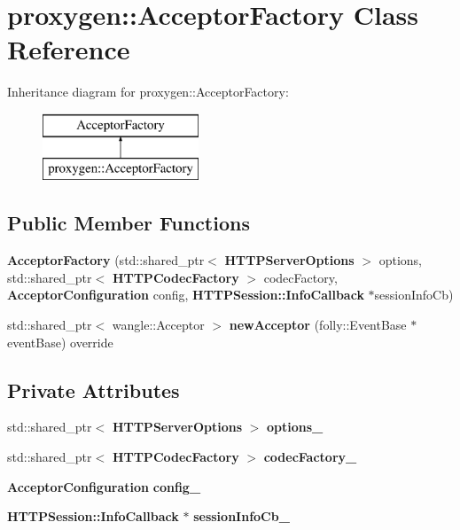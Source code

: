 \section{proxygen\+:\+:Acceptor\+Factory Class Reference}
\label{classproxygen_1_1AcceptorFactory}
Inheritance diagram for proxygen\+:\+:Acceptor\+Factory\+:\begin{figure}[H]
\begin{center}
\leavevmode
\includegraphics[height=2.000000cm]{classproxygen_1_1AcceptorFactory}
\end{center}
\end{figure}
\subsection*{Public Member Functions}
\begin{DoxyCompactItemize}
\item 
{\bf Acceptor\+Factory} (std\+::shared\+\_\+ptr$<$ {\bf H\+T\+T\+P\+Server\+Options} $>$ options, std\+::shared\+\_\+ptr$<$ {\bf H\+T\+T\+P\+Codec\+Factory} $>$ codec\+Factory, {\bf Acceptor\+Configuration} config, {\bf H\+T\+T\+P\+Session\+::\+Info\+Callback} $\ast$session\+Info\+Cb)
\item 
std\+::shared\+\_\+ptr$<$ wangle\+::\+Acceptor $>$ {\bf new\+Acceptor} (folly\+::\+Event\+Base $\ast$event\+Base) override
\end{DoxyCompactItemize}
\subsection*{Private Attributes}
\begin{DoxyCompactItemize}
\item 
std\+::shared\+\_\+ptr$<$ {\bf H\+T\+T\+P\+Server\+Options} $>$ {\bf options\+\_\+}
\item 
std\+::shared\+\_\+ptr$<$ {\bf H\+T\+T\+P\+Codec\+Factory} $>$ {\bf codec\+Factory\+\_\+}
\item 
{\bf Acceptor\+Configuration} {\bf config\+\_\+}
\item 
{\bf H\+T\+T\+P\+Session\+::\+Info\+Callback} $\ast$ {\bf session\+Info\+Cb\+\_\+}
\end{DoxyCompactItemize}


